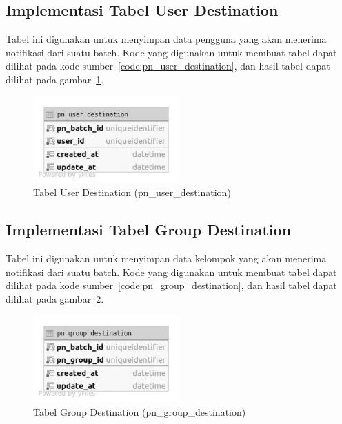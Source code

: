\subsection{Implementasi Tabel User Destination}
\par Tabel ini digunakan untuk menyimpan data pengguna yang akan menerima notifikasi dari suatu batch. Kode yang digunakan untuk membuat tabel dapat dilihat pada kode sumber~\ref{code:pn_user_destination}, dan hasil tabel dapat dilihat pada gambar~\ref{tabel_pn_user_destination}.

\begin{figure}[H]
    \centering\includegraphics[width=0.5\textwidth]{bab4/figures/tabel_pn_user_destination.jpg}
    \caption{Tabel User Destination (pn\_user\_destination)}
    \label{tabel_pn_user_destination}
\end{figure}

\subsection{Implementasi Tabel Group Destination}
\par Tabel ini digunakan untuk menyimpan data kelompok yang akan menerima notifikasi dari suatu batch. Kode yang digunakan untuk membuat tabel dapat dilihat pada kode sumber~\ref{code:pn_group_destination}, dan hasil tabel dapat dilihat pada gambar~\ref{tabel_pn_group_destination}.

\begin{figure}[H]
    \centering\includegraphics[width=0.5\textwidth]{bab4/figures/tabel_pn_group_destination.jpg}
    \caption{Tabel Group Destination (pn\_group\_destination)}
    \label{tabel_pn_group_destination}
\end{figure}


